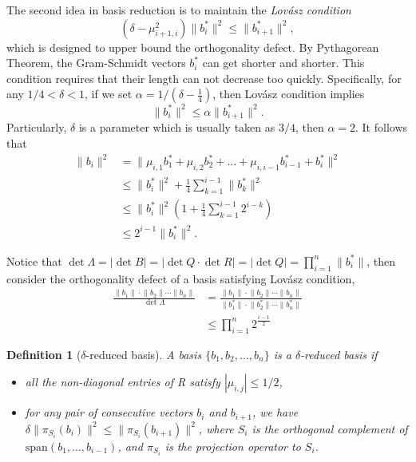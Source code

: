 \documentclass[twoside]{article}
\newtheorem{definition}[theorem]{Definition}
\begin{document}
The second idea in basis reduction is to maintain the \emph{Lov\'{a}sz condition}
$$(\delta-\mu_{i+1,i}^2)\lVert b_i^\ast\rVert^2 \leq \lVert b_{i+1}^\ast\rVert^2,$$
which is designed to upper bound the orthogonality defect. By Pythagorean Theorem, the Gram-Schmidt vectors $b_i^\ast$ can get shorter and shorter. This condition requires that their length can not decrease too quickly. Specifically, for any $1/4<\delta<1$, if we set $\alpha=1/(\delta-\frac{1}{4})$, then Lov\'{a}sz condition implies
$$\lVert b_i^\ast\rVert^2 \leq \alpha\lVert b_{i+1}^\ast\rVert^2.$$
Particularly, $\delta$ is a parameter which is usually taken as $3/4$, then $\alpha=2$. It follows that
\begin{align*}
\lVert b_i \rVert^2 &=  \lVert \mu_{i,1}b_1^\ast+\mu_{i,2}b_2^\ast+\dots+\mu_{i,i-1}b_{i-1}^\ast+b_i^\ast \rVert^2\\
&\leq  \lVert b_i^\ast\rVert^2+\frac{1}{4}\sum_{k=1}^{i-1}\lVert b_k^\ast\rVert^2\\
&\leq \lVert b_i^\ast\rVert^2(1+\frac{1}{4}\sum_{k=1}^{i-1}2^{i-k})\\
&\leq 2^{i-1}\lVert b_i^\ast\rVert^2.
\end{align*}

Notice that $\det \Lambda=|\det B |=|\det Q \cdot \det R |=|\det Q|=\prod_{i=1}^{n}\lVert b_i^\ast\rVert$, then consider the orthogonality defect of a basis satisfying Lov\'{a}sz condition,
\begin{align*}
\frac{\lVert b_1\rVert\cdot\lVert b_2\rVert\cdots\lVert b_n\rVert}{\det \Lambda} &=\frac{\lVert b_1\rVert\cdot\lVert b_2\rVert\cdots\lVert b_n\rVert}{\lVert b_1^\ast\rVert\cdot\lVert b_2^\ast\rVert\cdots\lVert b_n^\ast\rVert}\\
&\leq \prod_{i=1}^{n}2^\frac{i-1}{2}
\end{align*}
\begin{definition}[$\delta$-reduced basis]
A basis $\{b_1, b_2, \dots, b_n\}$ is a $\delta$-reduced basis if
\begin{itemize}
  \item all the non-diagonal entries of R satisfy $|\mu_{i,j}|\leq 1/2$,
  \item for any pair of consecutive vectors $b_i$ and $b_{i+1}$, we have $\delta\lVert\pi_{S_i}(b_i)\rVert^2\leq\lVert\pi_{S_i}(b_{i+1})\rVert^2$,
      where $S_i$ is the orthogonal complement of $\mbox{span}(b_1,\dots,b_{i-1})$, and $\pi_{S_i}$ is the projection operator to $S_i$.
\end{itemize}
\end{definition}
\end{document}
